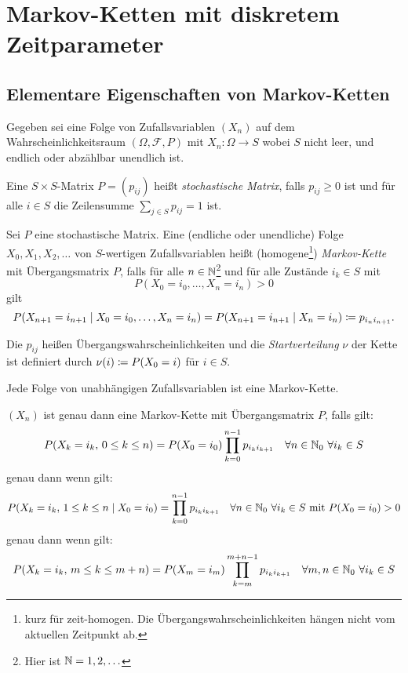 \documentclass[a4paper,twoside,DIV15,BCOR12mm]{scrbook}
\newcommand{\cF}{\mathcal F}
\begin{document}
\renewcommand{\thesection}{\arabic{section}}
\renewcommand{\thechapter}{\Roman{chapter}}

\chapter{Markov-Ketten mit diskretem Zeitparameter}

\section{Elementare Eigenschaften von Markov-Ketten}

Gegeben sei eine Folge von Zufallsvariablen $(X_n)$ auf dem Wahrscheinlichkeitsraum $(\Omega, \cF, P)$ mit $X_n:\Omega \to S$ wobei $S$ nicht leer, und endlich oder abzählbar unendlich ist.

\begin{definition}
Eine $S\times S$-Matrix $P=(p_{ij})$ heißt \emph{stochastische Matrix}, falls $p_{ij}\ge0$ ist und für alle $i\in S$ die Zeilensumme $\sum_{j\in S} p_{ij} = 1$ ist.
\end{definition}

\begin{definition}
Sei $P$ eine stochastische Matrix. Eine (endliche oder unendliche) Folge $X_0, X_1, X_2,\ldots$ von $S$-wertigen Zufallsvariablen heißt (homogene\footnote{kurz für zeit-homogen. Die Übergangswahrscheinlichkeiten hängen nicht vom aktuellen Zeitpunkt ab.}) \emph{Markov-Kette} mit Übergangsmatrix $P$, falls für alle $n\in \mathbb{N}$\footnote{Hier ist $\mathbb{N}=1,2,\ldots$} und für alle Zustände $i_k\in S$ mit 
\[
P(X_0=i_0,\ldots,X_n=i_n) >0
\]
gilt
\[
P(X_{n+1} = i_{n+1} \mid X_0 = i_0, \ldots, X_n=i_n) = 
P(X_{n+1} = i_{n+1} \mid X_n=i_n)\da p_{i_n i_{n+1}}.
\]

Die $p_{ij}$ heißen Übergangswahrscheinlichkeiten und die \emph{Startverteilung} $\nu$ der Kette ist definiert durch $\nu(i)\da P(X_0=i)$ für $i\in S$.
\end{definition}

\begin{bemerkung}
Jede Folge von unabhängigen Zufallsvariablen ist eine Markov-Kette.
\end{bemerkung}

\begin{satz}
\label{satz1.1}
$(X_n)$ ist genau dann eine Markov-Kette mit Übergangsmatrix $P$, falls gilt:
\[
P(X_k = i_k,\, 0\le k\le n) = P(X_0 = i_0)\prod_{k=0}^{n-1} p_{i_k i_{k+1}} \quad \forall n\in \mathbb{N}_0 \ \forall i_k\in S
\]
genau dann wenn gilt:
\[
P(X_k = i_k,\, 1\le k\le n \mid X_0=i_0) = \prod_{k=0}^{n-1} p_{i_k i_{k+1}} \quad \forall n\in \mathbb{N}_0 \ \forall i_k\in S\text{ mit $P(X_0=i_0)>0$}
\]
genau dann wenn gilt:
\[
P(X_k = i_k,\,m\le k\le m+n) = P(X_m=i_m)\prod_{k=m}^{m+n-1} p_{i_k i_{k+1}} \quad \forall m,n\in \mathbb{N}_0 \ \forall i_k\in S
\]
\end{satz}
\end{document}
